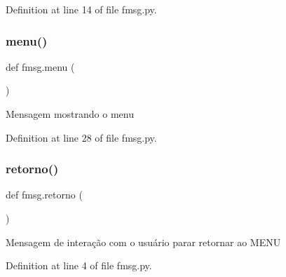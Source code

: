 Definition at line 14 of file fmsg.\+py.

\mbox{\label{namespacefmsg_a4ae0769c037745d48928af60c72284f4}} 
\subsubsection{menu()}
{\footnotesize\ttfamily def fmsg.\+menu (\begin{DoxyParamCaption}{ }\end{DoxyParamCaption})}

\begin{DoxyVerb}Mensagem mostrando o menu
\end{DoxyVerb}
 

Definition at line 28 of file fmsg.\+py.

\mbox{\label{namespacefmsg_a98e4410bdc5e02091f9a9bd5ff2546d6}} 
\subsubsection{retorno()}
{\footnotesize\ttfamily def fmsg.\+retorno (\begin{DoxyParamCaption}{ }\end{DoxyParamCaption})}

\begin{DoxyVerb}Mensagem de interação com o usuário parar retornar ao MENU
\end{DoxyVerb}
 

Definition at line 4 of file fmsg.\+py.

